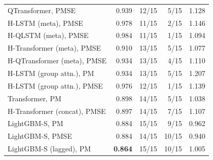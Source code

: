 \begin{tabular}{lrrrr}
QTransformer, PMSE & 0.939 & 12/15 & 5/15 & 1.128 \\
H-LSTM (meta), PMSE & 0.978 & 11/15 & 2/15 & 1.146 \\
H-QLSTM (meta), PMSE & 0.984 & 11/15 & 1/15 & 1.094 \\
H-Transformer (meta), PMSE & 0.910 & 13/15 & 5/15 & 1.077 \\
H-QTransformer (meta), PMSE & 0.934 & 13/15 & 4/15 & 1.110 \\
H-LSTM (group attn.), PM & 0.934 & 13/15 & 5/15 & 1.207 \\
H-LSTM (group attn.), PMSE & 0.976 & 12/15 & 1/15 & 1.139 \\
Transformer, PM & 0.898 & 14/15 & 5/15 & 1.038 \\
H-Transformer (concat), PMSE & 0.897 & 14/15 & 7/15 & 1.107 \\
LightGBM-S, PM & 0.884 & 15/15 & 9/15 & 0.962 \\
LightGBM-S, PMSE & 0.884 & 14/15 & 10/15 & 0.940 \\
LightGBM-S (lagged), PM & \textbf{0.864} & 15/15 & 10/15 & 1.005 \\
\bottomrule
\end{tabular}
